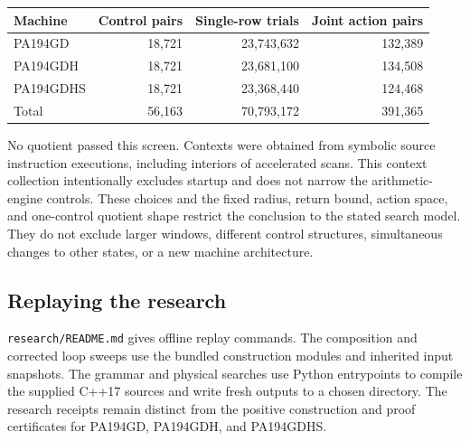 \begin{center}
\begin{tabular}{lrrr}
\toprule
Machine & Control pairs & Single-row trials & Joint action pairs\\
\midrule
PA194GD & 18,721 & 23,743,632 & 132,389\\
PA194GDH & 18,721 & 23,681,100 & 134,508\\
PA194GDHS & 18,721 & 23,368,440 & 124,468\\
\midrule
Total & 56,163 & 70,793,172 & 391,365\\
\bottomrule
\end{tabular}
\end{center}

No quotient passed this screen.  Contexts were obtained from symbolic source
instruction executions, including interiors of accelerated scans.  This
context collection intentionally excludes startup and does not narrow the
arithmetic-engine controls.  These choices and the fixed radius, return
bound, action space, and one-control quotient shape restrict the conclusion
to the stated search model.  They do not exclude larger windows, different
control structures, simultaneous changes to other states, or a new machine
architecture.

\subsection{Replaying the research}

\texttt{research/README.md} gives offline replay commands.  The composition
and corrected loop sweeps use the bundled construction modules and inherited
input snapshots.  The grammar and physical searches use Python entrypoints
to compile the supplied C++17 sources and write fresh outputs to a chosen
directory.  The research receipts remain distinct from the positive
construction and proof certificates for PA194GD, PA194GDH, and PA194GDHS.
